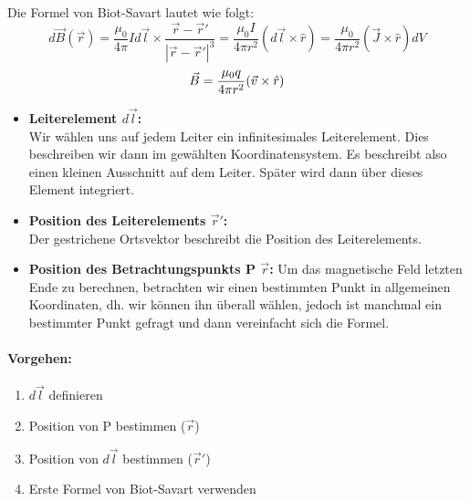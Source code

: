 \begin{tcolorbox}
    Die Formel von Biot-Savart lautet wie folgt: 
    \begin{equation*}
        d\Vec{B}(\Vec{r}) = \frac{\mu_0}{4 \pi}I d\Vec{l} \times \frac{\Vec{r}- \Vec{r}'}{|\Vec{r}- \Vec{r}'|^3}
        = \frac{\mu_0 I}{4 \pi r^2} (d \vec{l} \times \hat{r})
        = \frac{\mu_0}{4 \pi r^2} (\vec{J} \times \hat{r}) dV
    \end{equation*}
    \begin{align*}
        \vec{B} = \frac{\mu_0 q}{4 \pi r^2} (\vec{v} \times \hat{r})
    \end{align*}
    \begin{itemize}
        \item \textbf{Leiterelement $d\vec{l}$:} \\
        Wir wählen uns auf jedem Leiter ein infinitesimales Leiterelement. Dies beschreiben wir
        dann im gewählten Koordinatensystem. Es beschreibt also einen kleinen Ausschnitt auf dem
        Leiter. Später wird dann über dieses Element integriert.
        \item \textbf{Position des Leiterelements $ \vec{r}'$:} \\
        Der gestrichene Ortsvektor beschreibt die Position des Leiterelements.
        \item \textbf{Position des Betrachtungspunkts P $\vec{r}$:}
        Um das magnetische Feld letzten Ende zu berechnen, betrachten wir einen bestimmten Punkt in
        allgemeinen Koordinaten, dh. wir können ihn überall wählen, jedoch ist manchmal ein
        bestimmter Punkt gefragt und dann vereinfacht sich die Formel.
    \end{itemize}

    \paragraph{Vorgehen:}
    \begin{enumerate}
        \item $d\vec{l}$ definieren
        \item Position von P bestimmen ($\vec{r}$)
        \item Position von $d\vec{l}$ bestimmen ($\vec{r}'$)
        \item Erste Formel von Biot-Savart verwenden
    \end{enumerate}
\end{tcolorbox}

\vspace{1\baselineskip}

